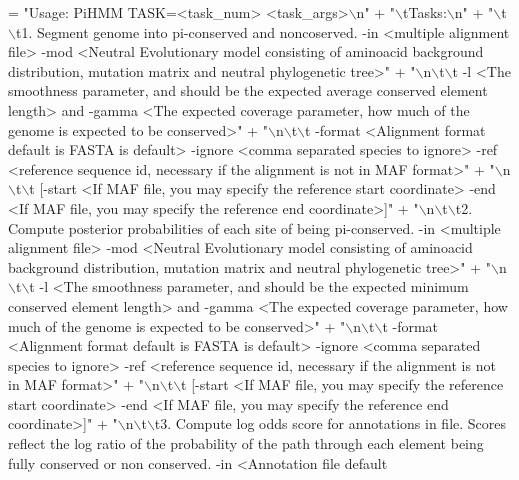 \begin{DoxyCode}
= \textcolor{stringliteral}{"Usage: PiHMM TASK=<task\_num> <task\_args>\(\backslash\)n"} +
    \textcolor{stringliteral}{"\(\backslash\)tTasks:\(\backslash\)n"} +
    \textcolor{stringliteral}{"\(\backslash\)t\(\backslash\)t1. Segment genome into pi-conserved and noncoserved.  -in <multiple alignment file>  -mod <Neutral
       Evolutionary model consisting of aminoacid background distribution, mutation matrix and neutral
       phylogenetic tree>"} +
    \textcolor{stringliteral}{"\(\backslash\)n\(\backslash\)t\(\backslash\)t -l <The smoothness parameter, and should be the expected average conserved element length> and
       -gamma <The expected coverage parameter, how much of the genome is expected to be conserved>"} +
    \textcolor{stringliteral}{"\(\backslash\)n\(\backslash\)t\(\backslash\)t -format <Alignment format default is FASTA is default> -ignore <comma separated species to
       ignore> -ref <reference sequence id, necessary if the alignment is not in MAF format>"} +
    \textcolor{stringliteral}{"\(\backslash\)n\(\backslash\)t\(\backslash\)t  [-start <If MAF file, you may specify the reference start coordinate> -end <If MAF file, you
       may specify the reference end coordinate>]"} +
    \textcolor{stringliteral}{"\(\backslash\)n\(\backslash\)t\(\backslash\)t2. Compute posterior probabilities of each site of being pi-conserved.  -in <multiple alignment
       file>  -mod <Neutral Evolutionary model consisting of aminoacid background distribution, mutation matrix and
       neutral phylogenetic tree>"} +
    \textcolor{stringliteral}{"\(\backslash\)n\(\backslash\)t\(\backslash\)t -l <The smoothness parameter, and should be the expected minimum conserved element length> and
       -gamma <The expected coverage parameter, how much of the genome is expected to be conserved>"} +
    \textcolor{stringliteral}{"\(\backslash\)n\(\backslash\)t\(\backslash\)t -format <Alignment format default is FASTA is default> -ignore <comma separated species to
       ignore> -ref <reference sequence id, necessary if the alignment is not in MAF format>"} +
    \textcolor{stringliteral}{"\(\backslash\)n\(\backslash\)t\(\backslash\)t  [-start <If MAF file, you may specify the reference start coordinate> -end <If MAF file, you
       may specify the reference end coordinate>]"} +
    \textcolor{stringliteral}{"\(\backslash\)n\(\backslash\)t\(\backslash\)t3. Compute log odds score for annotations in file. Scores reflect the log ratio of the
       probability of the path through each element being fully conserved or non conserved.  -in <Annotation file default
}
\end{DoxyCode}
